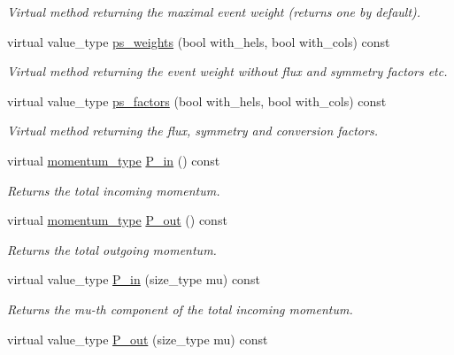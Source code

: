 \begin{DoxyCompactItemize}
\begin{DoxyCompactList}\small\item\em Virtual method returning the maximal event weight (returns one by default). \end{DoxyCompactList}\item 
virtual value\-\_\-type \hyperlink{a00442_a258fb687d61e5a0d9d12d5e1d45db8aa}{ps\-\_\-weights} (bool with\-\_\-hels, bool with\-\_\-cols) const 
\begin{DoxyCompactList}\small\item\em Virtual method returning the event weight without flux and symmetry factors etc. \end{DoxyCompactList}\item 
virtual value\-\_\-type \hyperlink{a00442_aea34ea1dada7a4cece83b42c7d50db55}{ps\-\_\-factors} (bool with\-\_\-hels, bool with\-\_\-cols) const 
\begin{DoxyCompactList}\small\item\em Virtual method returning the flux, symmetry and conversion factors. \end{DoxyCompactList}\item 
\hypertarget{a00442_a4cc227a869306f34f6d34efa01dbd357}{virtual \hyperlink{a00559}{momentum\-\_\-type} \hyperlink{a00442_a4cc227a869306f34f6d34efa01dbd357}{P\-\_\-in} () const }\label{a00442_a4cc227a869306f34f6d34efa01dbd357}

\begin{DoxyCompactList}\small\item\em Returns the total incoming momentum. \end{DoxyCompactList}\item 
\hypertarget{a00442_adbe567091708239995eba7c5897625c0}{virtual \hyperlink{a00559}{momentum\-\_\-type} \hyperlink{a00442_adbe567091708239995eba7c5897625c0}{P\-\_\-out} () const }\label{a00442_adbe567091708239995eba7c5897625c0}

\begin{DoxyCompactList}\small\item\em Returns the total outgoing momentum. \end{DoxyCompactList}\item 
\hypertarget{a00442_a7be32a29baf508f1957bd6f22bd6ae0c}{virtual value\-\_\-type \hyperlink{a00442_a7be32a29baf508f1957bd6f22bd6ae0c}{P\-\_\-in} (size\-\_\-type mu) const }\label{a00442_a7be32a29baf508f1957bd6f22bd6ae0c}

\begin{DoxyCompactList}\small\item\em Returns the mu-\/th component of the total incoming momentum. \end{DoxyCompactList}\item 
\hypertarget{a00442_afadc3f65e1c562102d5067e570c7fda9}{virtual value\-\_\-type \hyperlink{a00442_afadc3f65e1c562102d5067e570c7fda9}{P\-\_\-out} (size\-\_\-type mu) const }\label{a00442_afadc3f65e1c562102d5067e570c7fda9}


\end{DoxyCompactItemize}
